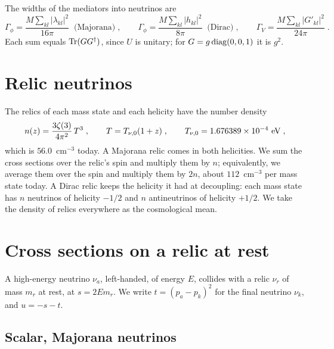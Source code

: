 \documentclass[11pt]{article}
\begin{document}
The widths of the mediators into neutrinos are
\begin{equation}
 \Gamma_\phi = \frac{M \sum_{kl} |\lambda_{kl}|^2}{16\pi} \;\; \text{(Majorana)} \;, \qquad
 \Gamma_\phi = \frac{M \sum_{kl} |h_{kl}|^2}{8\pi} \;\; \text{(Dirac)} \;, \qquad
 \Gamma_V = \frac{M \sum_{kl} |G'_{kl}|^2}{24\pi} \;.
\end{equation}
Each sum equals ${\rm Tr}(G G^\dagger)$, since $U$ is unitary; for $G = g\, {\rm diag}(0, 0, 1)$ it is $g^2$.

\section{Relic neutrinos}
\label{sec:relics}

The relics of each mass state and each helicity have the number density
\begin{equation}
 n(z) = \frac{3\zeta(3)}{4\pi^2}\, T^3 \;, \qquad T = T_{\nu,0}(1+z) \;, \qquad T_{\nu,0} = 1.676389 \times 10^{-4}~{\rm eV} \;,
\end{equation}
which is $56.0$~cm$^{-3}$ today.
A Majorana relic comes in both helicities.
We sum the cross sections over the relic's spin and multiply them by $n$; equivalently, we average them over the spin and multiply them by $2n$, about $112$~cm$^{-3}$ per mass state today.
A Dirac relic keeps the helicity it had at decoupling: each mass state has $n$ neutrinos of helicity $-1/2$ and $n$ antineutrinos of helicity $+1/2$.
We take the density of relics everywhere as the cosmological mean.

\section{Cross sections on a relic at rest}
\label{sec:xsec}

A high-energy neutrino $\nu_a$, left-handed, of energy $E$, collides with a relic $\nu_r$ of mass $m_r$ at rest, at $s = 2E m_r$.
We write $t = (p_a - p_k)^2$ for the final neutrino $\nu_k$, and $u = -s - t$.

\subsection*{Scalar, Majorana neutrinos}
\end{document}

